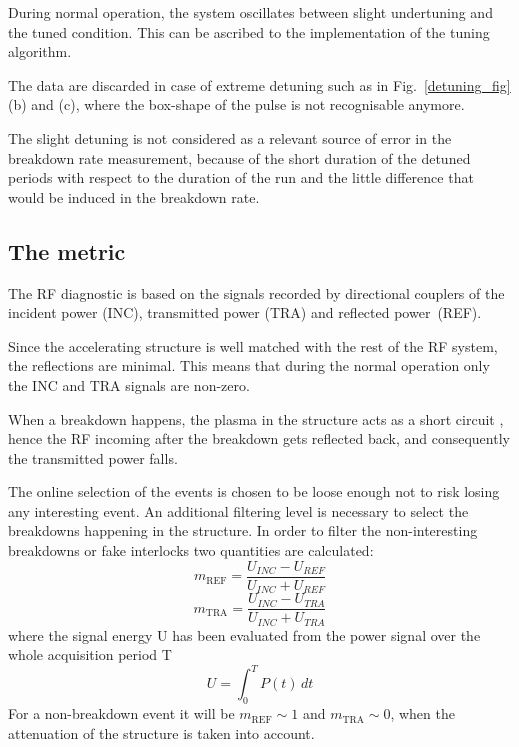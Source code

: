 During normal operation, the system oscillates between slight undertuning and the tuned condition. This can be ascribed to the implementation of the tuning algorithm.  

The data are discarded in case of extreme detuning such as in Fig.~\ref{detuning_fig} (b) and (c), where the box-shape of the pulse is not recognisable anymore.

The slight detuning is not considered as a relevant source of error in the breakdown rate measurement,  because of the short duration of the detuned periods with respect to the duration of the run and the little difference that would be induced in the breakdown rate.



\subsection[The metric]{The metric}

The RF diagnostic is based on the signals recorded by directional couplers of the incident power (INC), transmitted power (TRA) and reflected power~(REF). 

Since the accelerating structure is well matched with the rest of the RF system, the reflections are minimal. This means that during the normal operation only the INC and TRA signals are non-zero.

When a breakdown happens, the plasma in the structure acts as a short circuit \cite{Degiovanni:2025952}, hence the RF incoming after the breakdown gets reflected back, and consequently the transmitted power falls. 

The online selection of the events is chosen to be loose enough not to risk losing any interesting event. An additional filtering level is necessary to select the breakdowns happening in the structure. In order to filter the non-interesting breakdowns or fake interlocks two quantities are calculated:
\begin{equation}
m_{\text{REF}}  =  \frac{ U_{INC} -  U_{REF}   }{  U_{INC} + U_{REF}   }
\end{equation}
\begin{equation}
m_{\text{TRA}}  =  \frac{ U_{INC} -  U_{TRA}   }{  U_{INC} +  U_{TRA}   }
\end{equation}
where the signal energy U has been evaluated from the power signal over the whole acquisition period T
\begin{equation}
U = \int_0^T P(t) \, dt
\end{equation}
For a non-breakdown event it will be $m_{\text{REF}} \sim 1$ and $m_{\text{TRA}} \sim 0$, when the attenuation of the structure is taken into account.

